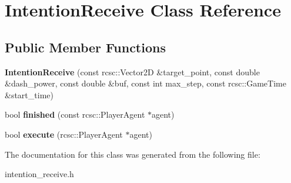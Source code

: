 \hypertarget{classIntentionReceive}{
\section{IntentionReceive Class Reference}
\label{classIntentionReceive}
}
\subsection*{Public Member Functions}
\begin{DoxyCompactItemize}
\item 
\hypertarget{classIntentionReceive_a6a2e905fc336cc27679c5adfd8398ecd}{
{\bfseries IntentionReceive} (const rcsc::Vector2D \&target\_\-point, const double \&dash\_\-power, const double \&buf, const int max\_\-step, const rcsc::GameTime \&start\_\-time)}
\label{classIntentionReceive_a6a2e905fc336cc27679c5adfd8398ecd}

\item 
\hypertarget{classIntentionReceive_adcfc9e2a603676fc47e928fce258e9e4}{
bool {\bfseries finished} (const rcsc::PlayerAgent $\ast$agent)}
\label{classIntentionReceive_adcfc9e2a603676fc47e928fce258e9e4}

\item 
\hypertarget{classIntentionReceive_abceab1d883e6f1bb214d171b79c0fd83}{
bool {\bfseries execute} (rcsc::PlayerAgent $\ast$agent)}
\label{classIntentionReceive_abceab1d883e6f1bb214d171b79c0fd83}

\end{DoxyCompactItemize}


The documentation for this class was generated from the following file:\begin{DoxyCompactItemize}
\item 
intention\_\-receive.h\end{DoxyCompactItemize}
